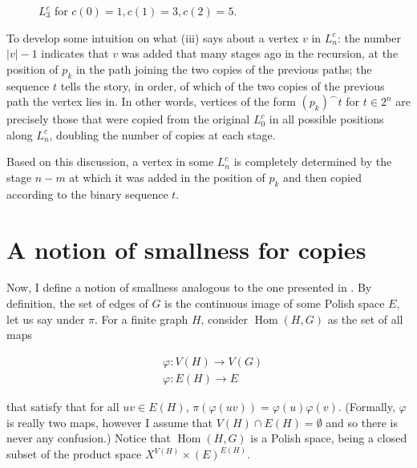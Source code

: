 \documentclass[11pt]{article}
\theoremstyle{plain}
\theoremstyle{definition}
\theoremstyle{remark}
\DeclareMathOperator{\Hom}{Hom}
\begin{document}
\begin{figure}[ht]
    \caption{$L_3^c$ for $c(0)=1,c(1)=3,c(2)=5$.}
    \label{fig:L_n}
\end{figure}

To develop some intuition on what (iii) says about a vertex $v$ in $L^c_n$: the number $|v|-1$ indicates that $v$ was added that many stages ago in the recursion, at the position of $p_k$ in the path joining the two copies of the previous paths; the sequence $t$ tells the story, in order, of which of the two copies of the previous path the vertex lies in.
In other words, vertices of the form $(p_k)^\smallfrown t$ for $t\in 2^n$ are precisely those that were copied from the original $L^c_0$ in all possible positions along $L^c_n$, doubling the number of copies at each stage.

Based on this discussion, a vertex in some $L^c_n$ is completely determined by the stage $n-m$ at which it was added in the position of $p_k$ and then copied according to the binary sequence $t$.

\section{A notion of smallness for copies}\label{sec:notion-smallness}

Now, I define a notion of smallness analogous to the one presented in \cite{Bernshteyn2024}.
By definition, the set of edges of $G$ is the continuous image of some Polish space $E$, let us say under $\pi$.
For a finite graph $H$, consider $\Hom(H,G)$ as the set of all maps

\begin{align*}
    &\varphi\colon V(H)\to V(G)\\
    &\varphi\colon E(H)\to E
\end{align*}

that satisfy that for all $uv\in E(H)$, $\pi(\varphi(uv))=\varphi(u)\varphi(v)$.
(Formally, $\varphi$ is really two maps, however I assume that $V(H)\cap E(H)=\emptyset$ and so there is never any confusion.)
Notice that $\Hom(H,G)$ is a Polish space, being a closed subset of the product space $X^{V(H)}\times(E)^{E(H)}$.
\end{document}
